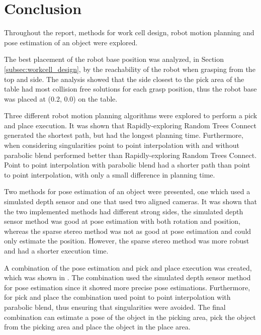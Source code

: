 \documentclass[../main.tex]{subfiles}
\begin{document}
\section{Conclusion} \label{sec:conclusion}
Throughout the report, methods for work cell design, robot motion planning and pose estimation of an object were explored.

The best placement of the robot base position was analyzed, in Section \ref{subsec:workcell_design}, by the reachability of the robot when grasping from the top and side. The analysis showed that the side closest to the pick area of the table had most collision free solutions for each grasp position, thus the robot base was placed at (0.2, 0.0) on the table.

Three different robot motion planning algorithms were explored to perform a pick and place execution. It was shown that Rapidly-exploring Random Trees Connect generated the shortest path, but had the longest planning time. Furthermore, when considering singularities point to point interpolation with and without parabolic blend performed better than Rapidly-exploring Random Trees Connect. Point to point interpolation with parabolic blend had a shorter path than point to point interpolation, with only a small difference in planning time.

Two methods for pose estimation of an object were presented, one which used a simulated depth sensor and one that used two aligned cameras. It was shown that the two implemented methods had different strong sides, the simulated depth sensor method was good at pose estimation with both rotation and position, whereas the sparse stereo method was not as good at pose estimation and could only estimate the position. However, the sparse stereo method was more robust and had a shorter execution time.

A combination of the pose estimation and pick and place execution was created, which was shown in \cite{combi_vid}. The combination used the simulated depth sensor method for pose estimation since it showed more precise pose estimations. Furthermore, for pick and place the combination used point to point interpolation with parabolic blend, thus ensuring that singularities were avoided. The final combination can estimate a pose of the object in the picking area, pick the object from the picking area and place the object in the place area. 
\end{document}
